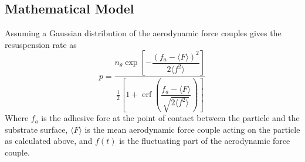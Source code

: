\documentclass{article}
\begin{document}
\subsection{Mathematical Model}

Assuming a Gaussian distribution of the aerodynamic force couples gives the resuspension rate as 
\begin{equation}\label{10}
p = \frac{
n_\theta \exp\!\left[-\dfrac{(f_a - \langle{F}\rangle)^2}{2\langle{f^2}\rangle}\right]
}{
\frac{1}{2} \left[ 1 + \operatorname{erf}\!\left(
\dfrac{f_a - \langle{F}\rangle}{\sqrt{2\langle{f^2}\rangle}}
\right) \right]
}
\end{equation}
Where \(f_a\) is the adhesive fore at the point of contact between the particle and the substrate surface, \(\langle{F}\rangle\) is the mean aerodynamic force couple acting on the particle as calculated above, and \(f(t)\) is the fluctuating part of the aerodynamic force couple. 
\end{document}
